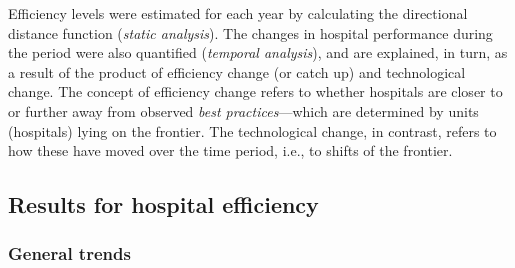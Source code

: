 \documentclass[11pt,a4paper,oneside]{article}
\newcommand{\azul}{\textcolor[rgb]{0.00,0.00,1.00}}
\begin{document}



Efficiency levels were estimated for each year by calculating the directional distance function (\textsl{static analysis}). The changes in hospital performance during the period were also quantified (\textsl{temporal analysis}), and are explained, in turn, as a result of the product of efficiency change (or catch up) and technological change. The concept of efficiency change refers to whether hospitals are closer to or further away from observed \textsl{best practices}---which are determined by units (hospitals) lying on the frontier. The technological change, in contrast, refers to how these have moved over the time period, i.e., to shifts of the frontier.


\subsection{Results for hospital efficiency}
\label{sec:hospital_efficiency}

\subsubsection{General trends}

\end{document}
